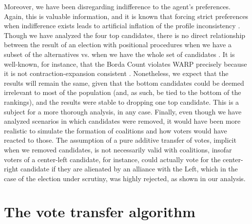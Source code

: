 \documentclass[hidelinks,11pt]{article}
\begin{document}
Moreover, we have been disregarding indifference to the agent's preferences.
Again, this is valuable information, and it is known that forcing strict
preferences when indifference exists leads to artificial inflation of the
profile inconsistency \parencite{gehrlein2010impact}. Though we have analyzed
the four top candidates, there is no direct relationship between the result of
an election with positional procedures when we have a subset of the alternatives
vs. when we have the whole set of candidates \parencite{saari2001chaotic}. It is
well-known, for instance, that the Borda Count violates WARP precisely because
it is not contraction-expansion consistent \parencite{schwartz2018cycles}.
Nonetheless, we expect that the results will remain the same, given that the
bottom candidates could be deemed irrelevant to most of the population (and, as
such, be tied to the bottom of the rankings), and the results were stable to dropping one top candidate. This is a subject for a more thorough analysis, in
any case. Finally, even though we have analyzed scenarios in which candidates
were removed, it would have been more realistic to simulate the formation of
coalitions and how voters would have reacted to those. The assumption of a pure
additive transfer of votes, implicit when we removed candidates, is not
necessarily valid with coalitions, insofar voters of a center-left candidate,
for instance, could actually vote for the center-right candidate if they are
alienated by an alliance with the Left, which in the case of the election under
scrutiny, was highly rejected, as shown in our analysis.


\printbibliography
\pagebreak
\appendix
\section{The vote transfer algorithm}\label{appendix:transfer}
\end{document}
